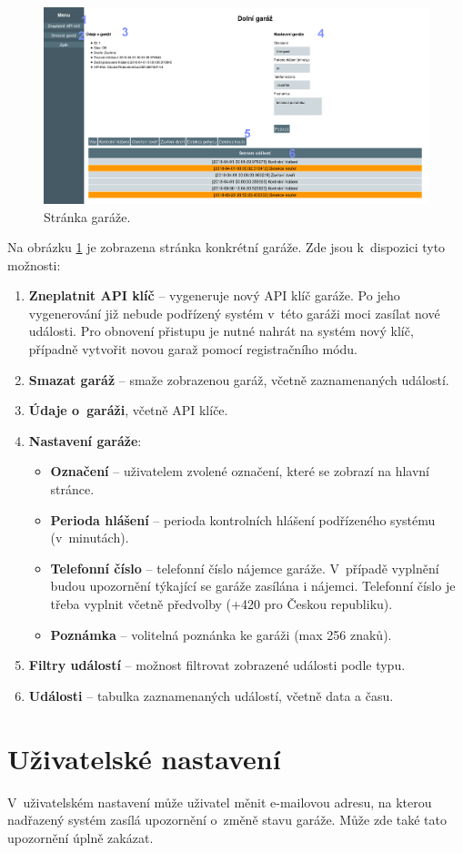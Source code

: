 \begin{figure}[h!]
    \centering
    \includegraphics[width=\textwidth]{images/garage_page.png}
    \caption[Stránka garáže]{Stránka garáže.}
    \label{fig:garage_page}
\end{figure}

Na obrázku \ref{fig:garage_page} je zobrazena stránka konkrétní garáže. Zde jsou k~dispozici tyto možnosti:

\begin{enumerate}
    \item \textbf{Zneplatnit API klíč} -- vygeneruje nový API klíč garáže. Po jeho vygenerování již nebude podřízený systém v~této garáži moci zasílat nové události. Pro obnovení přistupu je nutné nahrát na systém nový klíč, případně vytvořit novou garaž pomocí registračního módu.
    \item \textbf{Smazat garáž} -- smaže zobrazenou garáž, včetně zaznamenaných událostí.
    \item \textbf{Údaje o~garáži}, včetně API klíče.
    \item \textbf{Nastavení garáže}:
    \begin{itemize}
        \item \textbf{Označení} -- uživatelem zvolené označení, které se zobrazí na hlavní stránce.
        \item \textbf{Perioda hlášení} -- perioda kontrolních hlášení podřízeného systému (v~minutách).
        \item \textbf{Telefonní číslo} -- telefonní číslo nájemce garáže. V~případě vyplnění budou upozornění týkající se garáže zasílána i nájemci. Telefonní číslo je třeba vyplnit včetně předvolby (+420 pro Českou republiku).
        \item \textbf{Poznámka} -- volitelná poznánka ke garáži (max 256 znaků).
    \end{itemize}
    \item \textbf{Filtry událostí} -- možnost filtrovat zobrazené události podle typu.
    \item \textbf{Události} -- tabulka zaznamenaných událostí, včetně data a času.
\end{enumerate}


\section{Uživatelské nastavení}
\label{sec:guide_user_settings}

V~uživatelském nastavení může uživatel měnit e-mailovou adresu, na kterou nadřazený systém zasílá upozornění o~změně stavu garáže. Může zde také tato upozornění úplně zakázat.